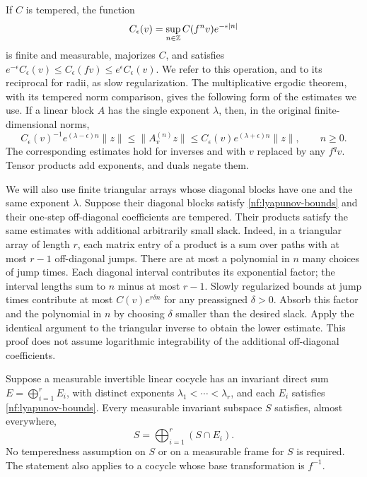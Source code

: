 If $C$ is tempered, the function
\[
 C_\epsilon(v)=\sup_{n\in\mathbb Z} C(f^n v)e^{-\epsilon|n|}
\]
is finite and measurable, majorizes $C$, and satisfies
$e^{-\epsilon}C_\epsilon(v)\leq C_\epsilon(fv)
\leq e^\epsilon C_\epsilon(v)$.  We refer to this operation, and to its
reciprocal for radii, as slow regularization.  The multiplicative
ergodic theorem, with its tempered norm comparison, gives the following
form of the estimates we use.  If a linear block $A$ has the single
exponent $\lambda$, then, in the original finite-dimensional norms,
\begin{equation}\label{nf:lyapunov-bounds}
 C_\epsilon(v)^{-1}e^{(\lambda-\epsilon)n}\|z\|
 \leq\|A_v^{(n)}z\|
 \leq C_\epsilon(v)e^{(\lambda+\epsilon)n}\|z\|,
 \qquad n\geq0.
\end{equation}
The corresponding estimates hold for inverses and with $v$ replaced
by any $f^qv$.  Tensor products add exponents, and duals negate them.

We will also use finite triangular arrays whose diagonal blocks have
one and the same exponent $\lambda$.  Suppose their diagonal blocks
satisfy \eqref{nf:lyapunov-bounds} and their one-step off-diagonal
coefficients are tempered.  Their products satisfy the same estimates
with additional arbitrarily small slack.  Indeed, in a triangular
array of length $r$, each matrix entry of a product is a sum over paths
with at most $r-1$ off-diagonal jumps.  There are at most a polynomial
in $n$ many choices of jump times.  Each diagonal interval contributes
its exponential factor; the interval lengths sum to $n$ minus at most
$r-1$.  Slowly regularized bounds at jump times contribute at most
$C(v)e^{r\delta n}$ for any preassigned $\delta>0$.  Absorb this factor
and the polynomial in $n$ by choosing $\delta$ smaller than the desired
slack.  Apply the identical argument to the triangular inverse to
obtain the lower estimate.  This proof does not assume logarithmic
integrability of the additional off-diagonal coefficients.

\begin{lemma}\label{nf:blocks}
Suppose a measurable invertible linear cocycle has an invariant direct
sum $E=\bigoplus_{i=1}^r E_i$, with distinct exponents
$\lambda_1<\cdots<\lambda_r$, and each $E_i$ satisfies
\eqref{nf:lyapunov-bounds}.  Every measurable invariant subspace $S$
satisfies, almost everywhere,
\[
 S=\bigoplus_{i=1}^r(S\cap E_i).
\]
No temperedness assumption on $S$ or on a measurable frame for $S$ is
required.  The statement also applies to a cocycle whose base
transformation is $f^{-1}$.
\end{lemma}

